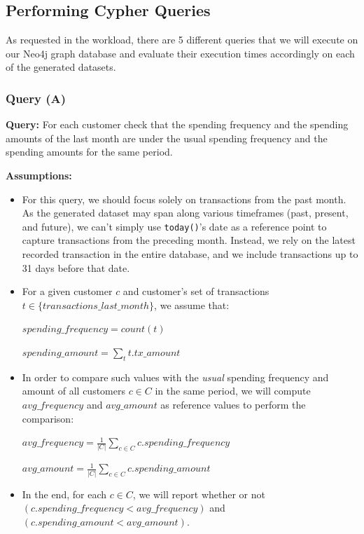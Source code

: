     \hypertarget{performing-cypher-queries}{%
\subsection{Performing Cypher Queries}\label{performing-cypher-queries}}

    As requested in the workload, there are 5 different queries that we will
execute on our Neo4j graph database and evaluate their execution times
accordingly on each of the generated datasets.

    \hypertarget{query-a}{%
\subsubsection{Query (A)}\label{query-a}}

    \textbf{Query:} For each customer check that the spending frequency and
the spending amounts of the last month are under the usual spending
frequency and the spending amounts for the same period.

\textbf{Assumptions:}

\begin{itemize}
\item
  For this query, we should focus solely on transactions from the past
  month. As the generated dataset may span along various timeframes
  (past, present, and future), we can't simply use \texttt{today()}'s
  date as a reference point to capture transactions from the preceding
  month. Instead, we rely on the latest recorded transaction in the
  entire database, and we include transactions up to 31 days before that
  date.
\item
  For a given customer \(c\) and customer's set of transactions
  \(t \in \{transactions\_last\_month\}\), we assume that:

  \(spending\_frequency = count(t)\)

  \(spending\_amount = \sum_{t} t.tx\_amount\)
\item
  In order to compare such values with the \emph{usual} spending
  frequency and amount of all customers \(c \in C\) in the same period,
  we will compute \(avg\_frequency\) and \(avg\_amount\) as reference
  values to perform the comparison:

  \(avg\_frequency = \frac{1}{|C|} \sum_{c \in C} c.spending\_frequency\)

  \(avg\_amount = \frac{1}{|C|} \sum_{c \in C} c.spending\_amount\)
\item
  In the end, for each \(c \in C\), we will report whether or not
  \((c.spending\_frequency < avg\_frequency)\) and
  \((c.spending\_amount < avg\_amount)\).
\end{itemize}

